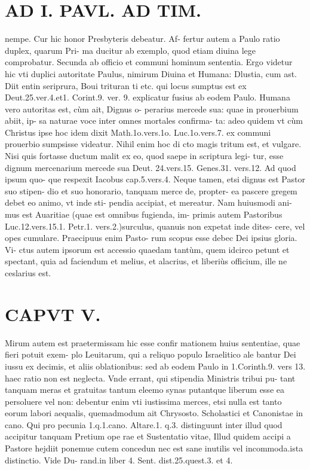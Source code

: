 \documentclass{article}
\begin{document}
\begin{pages}
\section*{AD I. PAVL. AD TIM. }
\marginpar{[ p.310 ]}\pstart nempe. Cur hic honor Presbyteris debeatur. Af- fertur autem a Paulo ratio duplex, quarum Pri- ma ducitur ab exemplo, quod etiam diuina lege comprobatur. Secunda ab officio et communi hominum sententia. Ergo videtur hic vti duplici autoritate Paulus, nimirum Diuina et Humana: Dlustia, cum ast. Diit entin seriprura, Boui trituran ti etc. qui locus sumptus est ex Deut.25.ver.4.et1. Corint.9. ver. 9. explicatur fusius ab eodem Paulo.  \pend\pstart Humana vero autoritas est, cùm ait, Dignus o- perarius mercede sua: quae in prouerbium abiit, ip- sa naturae voce inter omnes mortales confirma- ta: adeo quidem vt cùm Christus ipse hoc idem dixit Math.1o.vers.1o. Luc.1o.vers.7. ex communi prouerbio sumpsisse videatur. Nihil enim hoc di cto magis tritum est, et vulgare. Nisi quis fortasse ductum malit ex eo, quod saepe in scriptura legi- tur, esse dignum mercenarium mercede sua Deut. 24.vers.15. Genes.31. vers.12. Ad quod ipsum quo- que respexit Iacobus cap.5.vers.4.  \pend\pstart Neque tamen, etsi dignus est Pastor suo stipen- dio et suo honorario, tanquam merce de, propter- ea pascere gregem debet eo animo, vt inde sti- pendia accipiat, et mereatur. Nam huiusmodi ani- mus est Auaritiae (quae est omnibus fugienda, im- primis autem Pastoribus Luc.12.vers.15.1. Petr.1. vers.2.)surculus, quanuis non expetat inde dites- cere, vel opes cumulare. Praecipuus enim Pasto- rum scopus esse debec Dei ipsius gloria. Vi- ctus autem ipsorum est accessio quaedam tantùm, quem idcirco petunt et spectant, quia ad faciendum et melius, et alacrius, et liberiùs officium, ille ne ceslarius est.  \pend
\section*{CAPVT V. }
\marginpar{[ p.31 ]}\pstart Mirum autem est praetermissam hic esse confir mationem huius sententiae, quae fieri potuit exem- plo Leuitarum, qui a reliquo populo Israelitico ale bantur Dei iussu ex decimis, et aliis oblationibus: sed ab eodem Paulo in 1.Corinth.9. vers 13. haec ratio non est neglecta.  \pend\pstart Vnde errant, qui stipendia Ministris tribui pu- tant tanquam meras et gratuitas tantum eleemo synas putantque  liberum esse ea persoluere vel non: debentur enim vti iustissima merces, etsi nulla est tanto eorum labori aequalis, quemadmodum ait Chrysosto. Scholastici et Canonistae in cano. Qui pro pecunia 1.q.1.cano. Altare.1. q.3. distinguunt inter illud quod accipitur tanquam Pretium ope rae et Sustentatio vitae, Illud quidem accipi a Pastore hejdiit ponemue cutem concedun nec est sane inutilis vel incommoda.ista distinctio. Vide Du- rand.in liber 4. Sent. dist.25.quest.3. et 4.  \pend
{}
{}

\end{pages}
\end{document}
